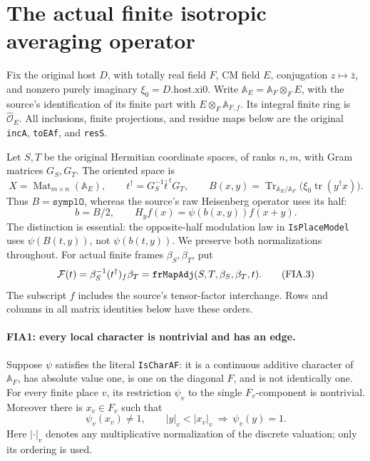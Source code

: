 \section{The actual finite isotropic averaging operator}
\label{sec:finite-isotropic-average-v033}


Fix the original host \(D\), with totally real field \(F\), CM field
\(E\), conjugation \(z\mapsto\bar z\), and nonzero purely imaginary
\(\xi_0=D.\mathrm{host}.\mathrm{xi0}\).  Write
\(\mathbb A_E=\mathbb A_F\otimes_F E\), with the source's
identification of its finite part with
\(E\otimes_F\mathbb A_{F,f}\).  Its integral finite ring is
\(\widehat{\mathcal O}_E\).  All inclusions, finite projections,
and residue maps below are the original
\texttt{incA}, \texttt{toEAf}, and \texttt{resS}.

Let \(S,T\) be the original Hermitian coordinate spaces, of ranks
\(n,m\), with Gram matrices \(G_S,G_T\).  The oriented space is
\[
 X=\operatorname{Mat}_{m\times n}(\mathbb A_E),\qquad
 t^\dagger=G_S^{-1}\bar t^{\,t}G_T,\qquad
 B(x,y)=\operatorname{Tr}_{\mathbb A_E/\mathbb A_F}
                  \bigl(\xi_0\operatorname{tr}(y^\dagger x)\bigr).
 \tag{FIA.1}
\]
Thus \(B=\texttt{symplO}\), whereas the source's raw Heisenberg
operator uses its half:
\[
 b=B/2,\qquad H_y f(x)=\psi(b(x,y))f(x+y).
 \tag{FIA.2}
\]
The distinction is essential: the opposite-half modulation law in
\texttt{IsPlaceModel} uses \(\psi(B(t,y))\), not
\(\psi(b(t,y))\).  We preserve both normalizations throughout.
For actual finite frames \(\beta_S,\beta_T\), put
\[
 {\cal F}(t)=\beta_S^{-1}(t^\dagger)_f\beta_T
       =\texttt{frMapAdj}(S,T,\beta_S,\beta_T,t).
 \tag{FIA.3}
\]
The subscript \(f\) includes the source's tensor-factor interchange.
Rows and columns in all matrix identities below have these orders.

\paragraph{FIA1: every local character is nontrivial and has an edge.}
\label{claim:FIA1}
Suppose \(\psi\) satisfies the literal \texttt{IsCharAF}:
it is a continuous additive character of \(\mathbb A_F\), has
absolute value one, is one on the diagonal \(F\), and is not
identically one.  For every finite place \(v\), its restriction
\(\psi_v\) to the single \(F_v\)-component is nontrivial.
Moreover there is \(x_v\in F_v\) such that
\[
 \psi_v(x_v)\ne1,\qquad
 |y|_v<|x_v|_v\ \Longrightarrow\ \psi_v(y)=1.
 \tag{FIA.4}
\]
Here \(|\cdot|_v\) denotes any multiplicative normalization of
the discrete valuation; only its ordering is used.

